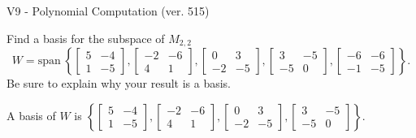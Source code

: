 \begin{exercise}
  \begin{exerciseTitle}V9 - Polynomial Computation (ver. 515)\end{exerciseTitle}
  \begin{exerciseStatement}
    Find a basis for the subspace of \(M_{2,2}\) 
\[W=\mathrm{span}\ \left\{\left[\begin{array}{cc}
5 & -4 \\
1 & -5
\end{array}\right] , \left[\begin{array}{cc}
-2 & -6 \\
4 & 1
\end{array}\right] , \left[\begin{array}{cc}
0 & 3 \\
-2 & -5
\end{array}\right] , \left[\begin{array}{cc}
3 & -5 \\
-5 & 0
\end{array}\right] , \left[\begin{array}{cc}
-6 & -6 \\
-1 & -5
\end{array}\right]\right\}.\]
 Be sure to explain why your result is a basis.


  \end{exerciseStatement}
  \begin{exerciseAnswer}
   A basis of \(W\) is  \(\left\{\left[\begin{array}{cc}
5 & -4 \\
1 & -5
\end{array}\right] , \left[\begin{array}{cc}
-2 & -6 \\
4 & 1
\end{array}\right] , \left[\begin{array}{cc}
0 & 3 \\
-2 & -5
\end{array}\right] , \left[\begin{array}{cc}
3 & -5 \\
-5 & 0
\end{array}\right]\right\}\).
  


  \end{exerciseAnswer}
\end{exercise}